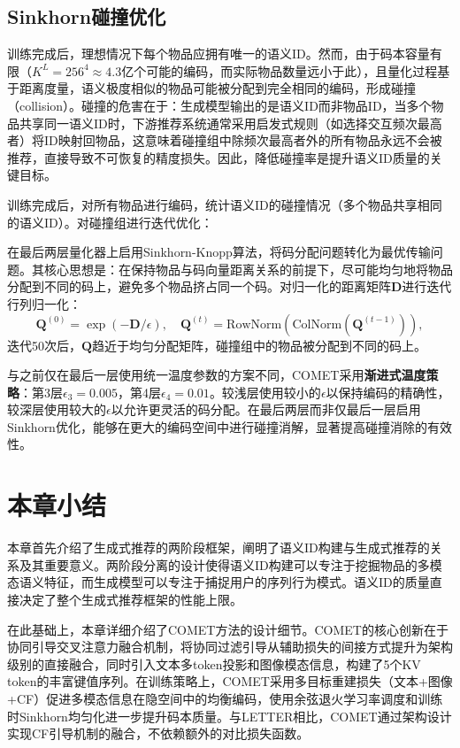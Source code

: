 \subsection{Sinkhorn碰撞优化}

训练完成后，理想情况下每个物品应拥有唯一的语义ID。然而，由于码本容量有限（$K^L = 256^4 \approx 4.3$亿个可能的编码，而实际物品数量远小于此），且量化过程基于距离度量，语义极度相似的物品可能被分配到完全相同的编码，形成碰撞（collision）。碰撞的危害在于：生成模型输出的是语义ID而非物品ID，当多个物品共享同一语义ID时，下游推荐系统通常采用启发式规则（如选择交互频次最高者）将ID映射回物品，这意味着碰撞组中除频次最高者外的所有物品永远不会被推荐，直接导致不可恢复的精度损失。因此，降低碰撞率是提升语义ID质量的关键目标。

训练完成后，对所有物品进行编码，统计语义ID的碰撞情况（多个物品共享相同的语义ID）。对碰撞组进行迭代优化：

在最后两层量化器上启用Sinkhorn-Knopp算法\cite{cuturi2013sinkhorn}，将码分配问题转化为最优传输问题。其核心思想是：在保持物品与码向量距离关系的前提下，尽可能均匀地将物品分配到不同的码上，避免多个物品挤占同一个码。对归一化的距离矩阵$\mathbf{D}$进行迭代行列归一化：
\begin{equation}
  \mathbf{Q}^{(0)} = \exp(-\mathbf{D} / \epsilon), \quad \mathbf{Q}^{(t)} = \text{RowNorm}(\text{ColNorm}(\mathbf{Q}^{(t-1)})),
\end{equation}
迭代50次后，$\mathbf{Q}$趋近于均匀分配矩阵，碰撞组中的物品被分配到不同的码上。

与之前仅在最后一层使用统一温度参数的方案不同，COMET采用\textbf{渐进式温度策略}：第3层$\epsilon_3 = 0.005$，第4层$\epsilon_4 = 0.01$。较浅层使用较小的$\epsilon$以保持编码的精确性，较深层使用较大的$\epsilon$以允许更灵活的码分配。在最后两层而非仅最后一层启用Sinkhorn优化，能够在更大的编码空间中进行碰撞消解，显著提高碰撞消除的有效性。


\section{本章小结}

本章首先介绍了生成式推荐的两阶段框架，阐明了语义ID构建与生成式推荐的关系及其重要意义。两阶段分离的设计使得语义ID构建可以专注于挖掘物品的多模态语义特征，而生成模型可以专注于捕捉用户的序列行为模式。语义ID的质量直接决定了整个生成式推荐框架的性能上限。

在此基础上，本章详细介绍了COMET方法的设计细节。COMET的核心创新在于协同引导交叉注意力融合机制，将协同过滤引导从辅助损失的间接方式提升为架构级别的直接融合，同时引入文本多token投影和图像模态信息，构建了5个KV token的丰富键值序列。在训练策略上，COMET采用多目标重建损失（文本+图像+CF）促进多模态信息在隐空间中的均衡编码，使用余弦退火学习率调度和训练时Sinkhorn均匀化进一步提升码本质量。与LETTER相比，COMET通过架构设计实现CF引导机制的融合，不依赖额外的对比损失函数。
